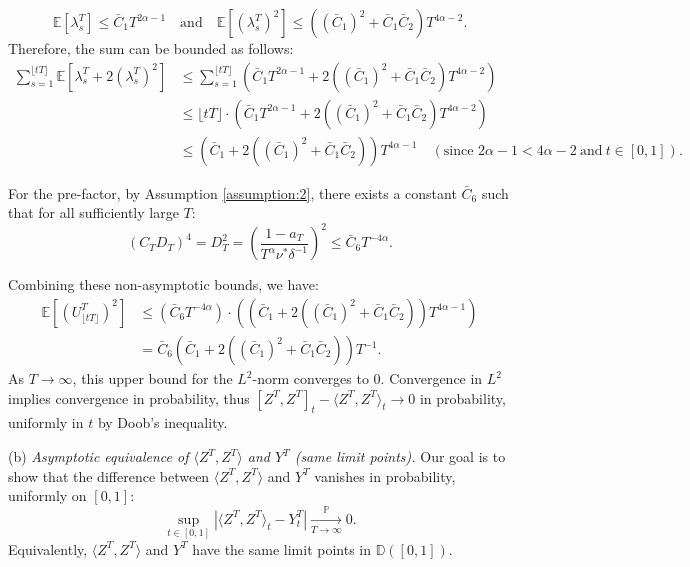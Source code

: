 \documentclass[letterpaper]{article}
\numberwithin{equation}{section}
\theoremstyle{definition}
\theoremstyle{remark}
\begin{document}
\[ \mathbb{E}[\lambda_s^T] \le \bar{C}_1 T^{2\alpha-1} \quad \text{and} \quad \mathbb{E}[(\lambda_s^T)^2] \le ((\bar C_1)^2+\bar C_1\bar C_2) T^{4\alpha-2}. \]
Therefore, the sum can be bounded as follows:
\begin{align*}
    \sum_{s=1}^{\lfloor tT \rfloor} \mathbb{E}[\lambda_s^T + 2(\lambda_s^T)^2] 
    &\le \sum_{s=1}^{\lfloor tT \rfloor} (\bar{C}_1 T^{2\alpha-1} + 2((\bar C_1)^2+\bar C_1\bar C_2) T^{4\alpha-2}) \\
    &\le \lfloor tT \rfloor \cdot (\bar{C}_1 T^{2\alpha-1} + 2((\bar C_1)^2+\bar C_1\bar C_2) T^{4\alpha-2}) \\
    &\le (\bar{C}_1 + 2((\bar C_1)^2+\bar C_1\bar C_2)) T^{4\alpha-1} \quad (\text{since } 2\alpha-1 < 4\alpha-2\ \text{and}\ t\in[0,1]).
\end{align*}

For the pre-factor, by Assumption \ref{assumption:2}, there exists a constant $\bar C_6$ such that for all sufficiently large $T$:
\[ (C_T D_T)^4 = D_T^2 = \left( \frac{1-a_T}{T^\alpha \nu^*\delta^{-1}} \right)^2 \le \bar C_6 T^{-4\alpha}. \]

Combining these non-asymptotic bounds, we have:
\begin{align*}
    \mathbb{E}[(U_{\lfloor tT \rfloor}^T)^2] 
    &\le (\bar C_6 T^{-4\alpha}) \cdot \left( (\bar{C}_1 + 2((\bar C_1)^2+\bar C_1\bar C_2)) T^{4\alpha-1} \right) \\
    &= \bar C_6 (\bar{C}_1 + 2((\bar C_1)^2+\bar C_1\bar C_2)) T^{-1}.
\end{align*}
As $T \to \infty$, this upper bound for the $L^2$-norm converges to 0. Convergence in $L^2$ implies convergence in probability, thus $[Z^T, Z^T]_t - \langle Z^T, Z^T \rangle_t \to 0$ in probability, uniformly in $t$ by Doob's inequality.

{
(b) \textit{Asymptotic equivalence of $\langle Z^T, Z^T \rangle$ and $Y^T$ (same limit points).}
}
{
Our goal is to show that the difference between $\langle Z^T, Z^T \rangle$ and $Y^T$ vanishes in probability, uniformly on $[0,1]$:
\[
\sup_{t\in[0,1]}\left|\langle Z^T, Z^T \rangle_t-Y_t^T\right|\xrightarrow[T\to\infty]{\mathbb P}0.
\]
Equivalently, $\langle Z^T, Z^T \rangle$ and $Y^T$ have the same limit points in $\mathbb D([0,1])$.
}
\end{document}
